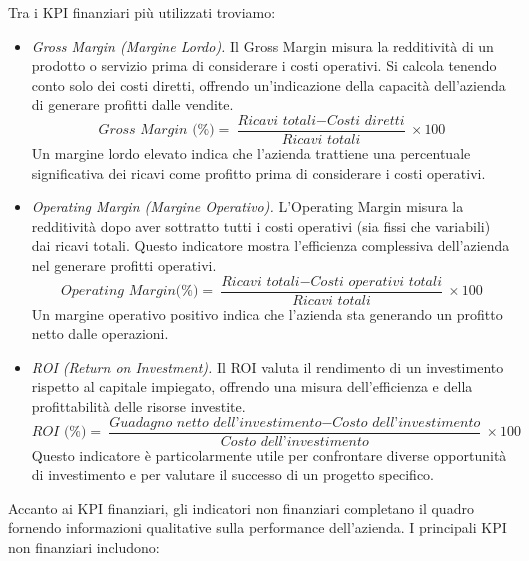 Tra i KPI finanziari più utilizzati troviamo:
\begin{itemize}
    \item \textit{Gross Margin (Margine Lordo).} Il Gross Margin misura la redditività di un prodotto o servizio prima di considerare i costi operativi. Si calcola tenendo conto solo dei costi diretti, offrendo un’indicazione della capacità dell’azienda di generare profitti dalle vendite.
    \begin{equation*}
    \textit{Gross Margin (\%)} = \frac{\textit{Ricavi totali} - \textit{Costi diretti}}{\textit{Ricavi totali}}\times 100
    \end{equation*}
    Un margine lordo elevato indica che l’azienda trattiene una percentuale significativa dei ricavi come profitto prima di considerare i costi operativi.
    
    \item \textit{Operating Margin (Margine Operativo).} L’Operating Margin misura la redditività dopo aver sottratto tutti i costi operativi (sia fissi che variabili) dai ricavi totali. Questo indicatore mostra l’efficienza complessiva dell’azienda nel generare profitti operativi.
    \begin{equation*}
    \textit{Operating Margin(\%)} = \frac{\textit{Ricavi totali} - \textit{Costi operativi totali}}{\textit{Ricavi totali}}\times 100        
    \end{equation*}
    Un margine operativo positivo indica che l’azienda sta generando un profitto netto dalle operazioni.
    
    \item \textit{ROI (Return on Investment).} Il ROI valuta il rendimento di un investimento rispetto al capitale impiegato, offrendo una misura dell’efficienza e della profittabilità delle risorse investite.
    \begin{equation*}
    \textit{ROI (\%)} = \frac{\textit{Guadagno netto dell’investimento} - \textit{Costo dell’investimento}}{\textit{Costo dell’investimento}}\times 100
    \end{equation*}
    Questo indicatore è particolarmente utile per confrontare diverse opportunità di investimento e per valutare il successo di un progetto specifico.
\end{itemize}
Accanto ai KPI finanziari, gli indicatori non finanziari completano il quadro fornendo informazioni qualitative sulla performance dell’azienda. I principali KPI non finanziari includono:
